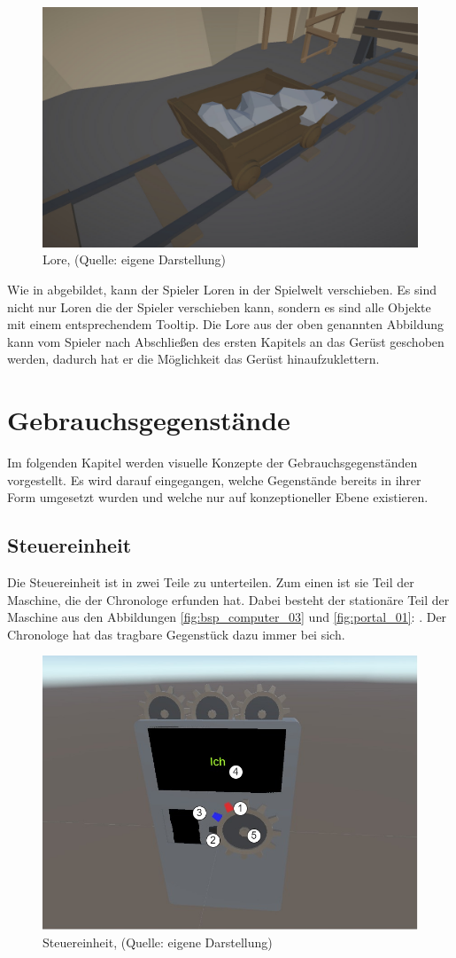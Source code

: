 \begin{figure}[ht]
\centering
\includegraphics[width=0.6\linewidth]{content/pictures/Lore.jpg}
\caption{Lore, (Quelle: eigene Darstellung)}
\label{fig:lore}
\end{figure}

Wie in  abgebildet, kann der Spieler Loren in der Spielwelt verschieben. Es sind nicht nur Loren die der Spieler verschieben kann, sondern es sind alle Objekte mit einem entsprechendem Tooltip. Die Lore aus der oben genannten Abbildung kann vom Spieler nach Abschließen des ersten Kapitels an das Gerüst geschoben werden, dadurch hat er die Möglichkeit das Gerüst hinaufzuklettern.

\section{Gebrauchsgegenstände}
Im folgenden Kapitel werden visuelle Konzepte der Gebrauchsgegenständen vorgestellt. Es wird darauf eingegangen, welche Gegenstände bereits in ihrer Form umgesetzt wurden und welche nur auf konzeptioneller Ebene existieren.

\subsection{Steuereinheit}
Die Steuereinheit ist in zwei Teile zu unterteilen. Zum einen ist sie Teil der Maschine, die der Chronologe erfunden hat. Dabei besteht der stationäre Teil der Maschine aus den Abbildungen \ref{fig:bsp_computer_03} und \ref{fig:portal_01}: . Der Chronologe hat das tragbare Gegenstück dazu immer bei sich.

\begin{figure}[ht]
\centering
\includegraphics[width=0.6\linewidth]{content/pictures/SplitDevice_markers.jpg}
\caption{Steuereinheit, (Quelle: eigene Darstellung)}
\label{fig:split_device_marker}
\end{figure}

